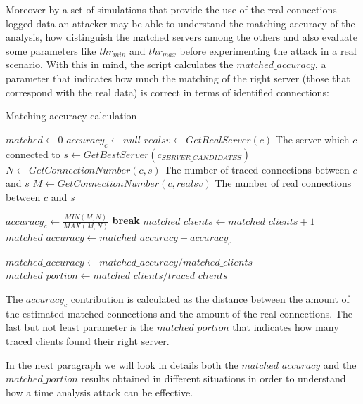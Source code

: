Moreover by a set of simulations
that provide the use of the real connections logged data an attacker
may be able to understand the matching accuracy of the analysis, how distinguish the
matched servers among the others and also evaluate some
parameters like $thr_{min}$ and $thr_{max}$ before 
experimenting the attack in a real scenario. 
With this in mind, the script
calculates the $matched\_accuracy$, a parameter that indicates how much
the matching of the right server (those that correspond with the real
data) is correct in terms of identified
connections:

\begin{algorithm}[H]
\caption{Matching accuracy calculation}
\begin{algorithmic}
\State $matched \gets 0$
	\State $accuracy_c \gets null$
	\State $realsv \gets GetRealServer(c)$ 
	{\footnotesize \Comment The server which $c$ connected to}
	\State $s \gets GetBestServer(c_{SERVER\_CANDIDATES})$
		\State $N \gets GetConnectionNumber(c, s) $ 
		{\footnotesize \Comment The number of traced connections between $c$ and $s$}
		\State $M \gets GetConnectionNumber(c, realsv)$ 
		{\footnotesize \Comment The number of real connections between $c$ and $s$}

		\State $accuracy_c \gets \frac{ MIN(M, N)}{MAX(M, N)}$
	\State \textbf{break}
	\EndIf
		\State $matched\_clients \gets matched\_clients + 1$
		\State $matched\_accuracy \gets matched\_accuracy + accuracy_c$
	\EndIf	
\EndFor

\State $matched\_accuracy \gets matched\_accuracy / matched\_clients$
\State $matched\_portion \gets matched\_clients / traced\_clients$

\end{algorithmic}
\label{alg:launcher}
\end{algorithm}
 
The $accuracy_c$ contribution is calculated as the distance between the 
amount of the estimated matched connections
and the amount of the real connections.
The last but not least parameter is the $matched\_portion$ that indicates
how many traced clients found their right server. 


In the next paragraph we will look in details both the
$matched\_accuracy$ and the
$matched\_portion$
results obtained in different situations in order to understand how a
time analysis attack can be effective.

